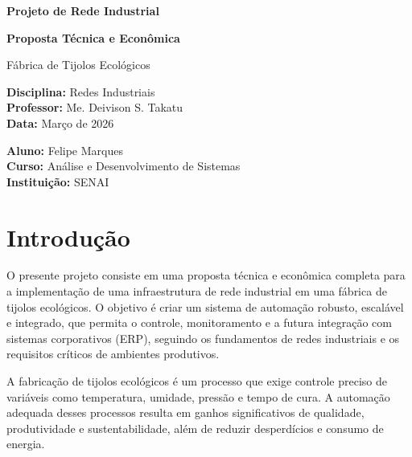 \documentclass[12pt,a4paper]{article}
\begin{document}
\begin{titlepage}
\centering
\vspace*{2cm}

{\Huge\bfseries Projeto de Rede Industrial\par}
\vspace{0.5cm}
{\LARGE\bfseries Proposta Técnica e Econômica\par}
\vspace{1cm}
{\Large Fábrica de Tijolos Ecológicos\par}

\vspace{2cm}

\begin{flushleft}
\textbf{Disciplina:} Redes Industriais\\
\textbf{Professor:} Me. Deivison S. Takatu\\
\textbf{Data:} Março de 2026
\end{flushleft}

\vspace{2cm}

\begin{flushright}
\textbf{Aluno:} Felipe Marques\\
\textbf{Curso:} Análise e Desenvolvimento de Sistemas\\
\textbf{Instituição:} SENAI
\end{flushright}

\vfill

\end{titlepage}

\tableofcontents
\newpage

\section{Introdução}

O presente projeto consiste em uma proposta técnica e econômica completa para a implementação de uma infraestrutura de rede industrial em uma fábrica de tijolos ecológicos. O objetivo é criar um sistema de automação robusto, escalável e integrado, que permita o controle, monitoramento e a futura integração com sistemas corporativos (ERP), seguindo os fundamentos de redes industriais e os requisitos críticos de ambientes produtivos.

A fabricação de tijolos ecológicos é um processo que exige controle preciso de variáveis como temperatura, umidade, pressão e tempo de cura. A automação adequada desses processos resulta em ganhos significativos de qualidade, produtividade e sustentabilidade, além de reduzir desperdícios e consumo de energia.
\end{document}
